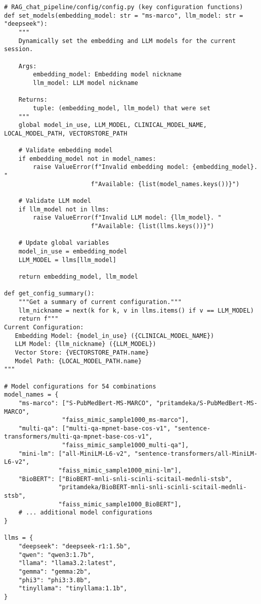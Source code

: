 \begin{verbatim}
# RAG_chat_pipeline/config/config.py (key configuration functions)
def set_models(embedding_model: str = "ms-marco", llm_model: str = "deepseek"):
    """
    Dynamically set the embedding and LLM models for the current session.
    
    Args:
        embedding_model: Embedding model nickname 
        llm_model: LLM model nickname
    
    Returns:
        tuple: (embedding_model, llm_model) that were set
    """
    global model_in_use, LLM_MODEL, CLINICAL_MODEL_NAME, LOCAL_MODEL_PATH, VECTORSTORE_PATH

    # Validate embedding model
    if embedding_model not in model_names:
        raise ValueError(f"Invalid embedding model: {embedding_model}. "
                        f"Available: {list(model_names.keys())}")

    # Validate LLM model
    if llm_model not in llms:
        raise ValueError(f"Invalid LLM model: {llm_model}. "
                        f"Available: {list(llms.keys())}")

    # Update global variables
    model_in_use = embedding_model
    LLM_MODEL = llms[llm_model]

    return embedding_model, llm_model

def get_config_summary():
    """Get a summary of current configuration."""
    llm_nickname = next(k for k, v in llms.items() if v == LLM_MODEL)
    return f"""
Current Configuration:
   Embedding Model: {model_in_use} ({CLINICAL_MODEL_NAME})
   LLM Model: {llm_nickname} ({LLM_MODEL})
   Vector Store: {VECTORSTORE_PATH.name}
   Model Path: {LOCAL_MODEL_PATH.name}
"""

# Model configurations for 54 combinations
model_names = {
    "ms-marco": ["S-PubMedBert-MS-MARCO", "pritamdeka/S-PubMedBert-MS-MARCO", 
                "faiss_mimic_sample1000_ms-marco"],
    "multi-qa": ["multi-qa-mpnet-base-cos-v1", "sentence-transformers/multi-qa-mpnet-base-cos-v1", 
                "faiss_mimic_sample1000_multi-qa"],
    "mini-lm": ["all-MiniLM-L6-v2", "sentence-transformers/all-MiniLM-L6-v2", 
               "faiss_mimic_sample1000_mini-lm"],
    "BioBERT": ["BioBERT-mnli-snli-scinli-scitail-mednli-stsb", 
               "pritamdeka/BioBERT-mnli-snli-scinli-scitail-mednli-stsb", 
               "faiss_mimic_sample1000_BioBERT"],
    # ... additional model configurations
}

llms = {
    "deepseek": "deepseek-r1:1.5b",
    "qwen": "qwen3:1.7b",
    "llama": "llama3.2:latest",
    "gemma": "gemma:2b",
    "phi3": "phi3:3.8b",
    "tinyllama": "tinyllama:1.1b",
}
\end{verbatim}

